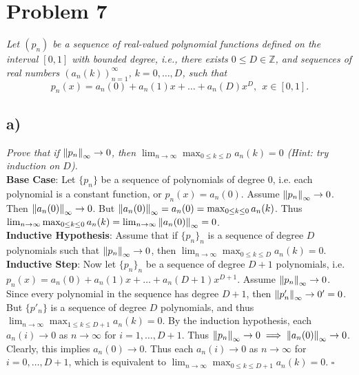 \documentclass[12pt]{article}
\begin{document}
\section*{Problem 7}
{\it Let $(p_n)$ be a sequence of real-valued polynomial functions defined on the interval $[0,1]$ with bounded degree, i.e., there exists $0 \leq D \in \mathbb{Z}$, and sequences of real numbers $(a_n(k))_{n=1}^{\infty}$, $k = 0, \dots, D$, such that}
\begin{equation}
	\label{problem_7_polynomial}
	p_n(x) = a_n(0) + a_n(1)x + \dots + a_n(D)x^D,\ \ x \in [0,1].
\end{equation}

\subsection*{ a)}
{\it Prove that if $\norm{p_n}_\infty \rightarrow 0$, then $\lim_{n\rightarrow\infty}\max_{0\leq k\leq D}a_n(k) = 0$ (Hint: try induction on $D$).} \\

\textbf{Base Case}: Let $\{p_n\}$ be a sequence of polynomials of degree $0$, i.e. each polynomial is a constant function, or $p_n(x) = a_n(0)$.  Assume $\norm{p_n}_\infty \rightarrow 0$.  Then $\norm{a_n(0)}_\infty \rightarrow 0$.  But $\norm{a_n(0)}_\infty = a_n(0) = \max_{0\leq k\leq 0}a_n(k)$.  Thus $\lim_{n\rightarrow \infty} \max_{0\leq k\leq 0}a_n(k) = \lim_{n\rightarrow\infty} \norm{a_n(0)}_\infty = 0$. \\

\textbf{Inductive Hypothesis}: Assume that if $\{p_n\}_n$ is a sequence of degree $D$ polynomials such that $\norm{p_n}_\infty \rightarrow 0$, then $\lim_{n\rightarrow\infty}\max_{0\leq k\leq D}a_n(k) = 0$. \\

\textbf{Inductive Step}: Now let $\{p_n\}_n$ be a sequence of degree $D+1$ polynomials, i.e. $p_n(x) = a_n(0) + a_n(1)x + \dots + a_n(D+1)x^{D+1}$.  Assume $\norm{p_n}_\infty \rightarrow 0$.  Since every polynomial in the sequence has degree $D+1$, then $\norm{p'_n}_\infty \rightarrow 0' = 0$.  But $\{p'_n\}$ is a sequence of degree $D$ polynomials, and thus $\lim_{n\rightarrow\infty}\max_{1\leq k\leq D+1}a_n(k) = 0$.  By the induction hypothesis, each $a_n(i) \rightarrow 0$ as $n\rightarrow \infty$ for $i = 1, \dots, D+1$.  Thus $\norm{p_n}_\infty \rightarrow 0 \implies \norm{a_n(0)}_\infty \rightarrow 0$.  Clearly, this implies $a_n(0) \rightarrow 0$.  Thus each $a_n(i) \rightarrow 0$ as $n\rightarrow\infty$ for $i = 0, \dots, D+1$, which is equivalent to $\lim_{n\rightarrow\infty}\max_{0\leq k\leq D+1}a_n(k) = 0$. \hfill $\square$
\end{document}
